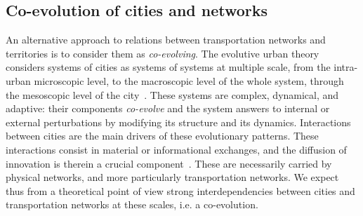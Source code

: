 \documentclass[11pt]{article}
\newcommand{\noun}[1]{\textsc{#1}}
\begin{document}





\subsection{Co-evolution of cities and networks}


An alternative approach to relations between transportation networks and territories is to consider them as \emph{co-evolving}. The evolutive urban theory considers systems of cities as systems of systems at multiple scale, from the intra-urban microscopic level, to the macroscopic level of the whole system, through the mesoscopic level of the city~\citep{pumain2008socio}. These systems are complex, dynamical, and adaptive: their components \emph{co-evolve} and the system answers to internal or external perturbations by modifying its structure and its dynamics. Interactions between cities are the main drivers of these evolutionary patterns. These interactions consist in material or informational exchanges, and the diffusion of innovation is therein a crucial component~\citep{pumain2010theorie}. These are necessarily carried by physical networks, and more particularly transportation networks. We expect thus from a theoretical point of view strong interdependencies between cities and transportation networks at these scales, i.e. a co-evolution.
\end{document}
